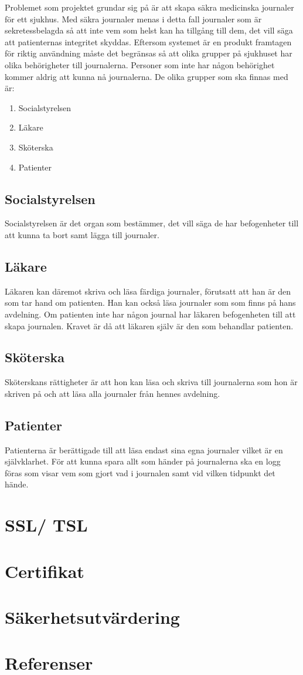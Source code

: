 \documentclass[a4paper]{article}
\begin{document}
Problemet som projektet grundar sig på är att skapa säkra medicinska journaler för ett sjukhus. Med säkra journaler menas i detta fall  journaler som är sekretessbelagda så att inte vem som helst kan ha tillgång till dem, det vill säga att patienternas integritet skyddas. Eftersom systemet är en produkt framtagen för riktig användning måste det begränsas så att olika grupper på sjukhuset har olika behörigheter till journalerna. Personer som inte har någon behörighet kommer aldrig att kunna nå journalerna. De olika grupper som ska finnas med är:

\begin{enumerate}
\item{Socialstyrelsen}
\item{Läkare}
\item{Sköterska}
\item{Patienter}
\end{enumerate} 


\subsection{Socialstyrelsen}
Socialstyrelsen är det organ som bestämmer, det vill säga de har befogenheter till att kunna ta bort samt lägga till journaler. 

\subsection{Läkare}
Läkaren kan däremot skriva och läsa färdiga journaler, förutsatt att han är den som tar hand om patienten. Han kan också läsa journaler som som finns på hans avdelning. Om patienten inte har någon journal har läkaren befogenheten till att skapa journalen. Kravet är då att läkaren själv är den som behandlar patienten.

\subsection{Sköterska}
Sköterskans rättigheter är att hon kan läsa och skriva till journalerna som hon är skriven på och att läsa alla journaler från hennes avdelning.

\subsection{Patienter}
Patienterna är berättigade till att läsa endast sina egna journaler vilket är en självklarhet.
För att kunna spara allt som händer på journalerna ska en logg föras som visar vem som gjort vad i journalen samt vid vilken tidpunkt det hände.


\section{SSL/ TSL}


\section{Certifikat}


\section{Säkerhetsutvärdering}


\section{Referenser}

\end{document}
